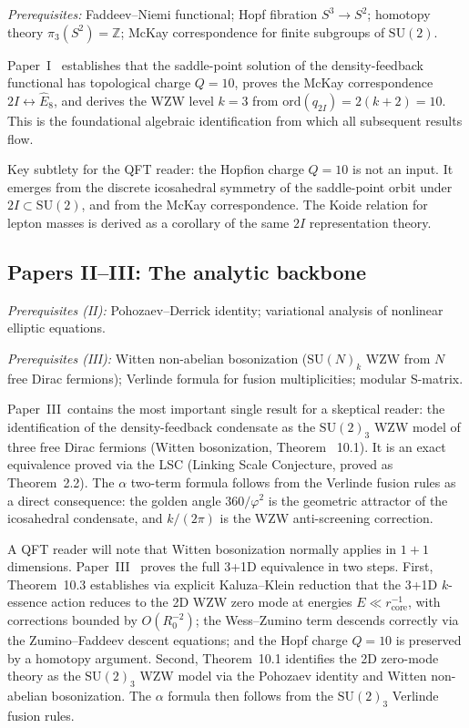 \documentclass[11pt,a4paper]{article}
\newcommand{\vp}{\varphi}
\newcommand{\ZZ}{\mathbb{Z}}
\newcommand{\twoI}{2I}
\newcommand{\Ehat}{\hat{E}_8}
\begin{document}
\textit{Prerequisites:} Faddeev--Niemi functional; Hopf fibration $S^3\to S^2$;
homotopy theory $\pi_3(S^2)=\ZZ$; McKay correspondence for finite subgroups of
$\mathrm{SU}(2)$.

Paper~I~\cite{Paper1} establishes that the saddle-point solution of the density-feedback
functional has topological charge $Q=10$, proves the McKay correspondence
$\twoI\leftrightarrow\Ehat$, and derives the WZW level $k=3$ from
$\mathrm{ord}(q_{\twoI}) = 2(k+2) = 10$. This is the foundational algebraic
identification from which all subsequent results flow.

Key subtlety for the QFT reader: the Hopfion charge $Q=10$ is not an input.
It emerges from the discrete icosahedral symmetry of the saddle-point orbit
under $\twoI\subset\mathrm{SU}(2)$, and from the McKay correspondence.
The Koide relation for lepton masses is derived as a corollary of the same
$\twoI$ representation theory.

\subsection{Papers II--III: The analytic backbone}

\textit{Prerequisites (II):} Pohozaev--Derrick identity; variational analysis
of nonlinear elliptic equations.

\textit{Prerequisites (III):} Witten non-abelian bosonization ($\mathrm{SU}(N)_k$
WZW from $N$ free Dirac fermions); Verlinde formula for fusion multiplicities;
modular S-matrix.

Paper~III~\cite{Paper3}contains the most important single result for a skeptical reader:
the identification of the density-feedback condensate as the $\mathrm{SU}(2)_3$
WZW model of three free Dirac fermions (Witten bosonization, Theorem
~10.1). It is an exact equivalence
proved via the LSC (Linking Scale Conjecture, proved as Theorem~2.2).
The $\alpha$ two-term formula follows from the Verlinde fusion rules as a direct
consequence: the golden angle $360/\vp^2$ is the geometric attractor of the
icosahedral condensate, and $k/(2\pi)$ is the WZW anti-screening correction.

A QFT reader will note that Witten bosonization normally applies in $1+1$ dimensions.
Paper~III~\cite{Paper3} proves the full 3+1D equivalence in two steps.
First, Theorem~10.3 establishes via
explicit Kaluza--Klein reduction that the 3+1D $k$-essence action reduces to the
2D WZW zero mode at energies $E \ll r_{\mathrm{core}}^{-1}$, with corrections
bounded by $O(R_0^{-2})$; the Wess--Zumino term descends correctly via the
Zumino--Faddeev descent equations; and the Hopf charge $Q=10$ is preserved by
a homotopy argument.
Second, Theorem~10.1 identifies the 2D zero-mode theory
as the $\mathrm{SU}(2)_3$ WZW model via the Pohozaev identity and Witten
non-abelian bosonization.
The $\alpha$ formula then follows from the $\mathrm{SU}(2)_3$ Verlinde fusion rules.
\end{document}
